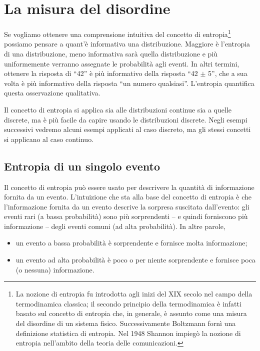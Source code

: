 \documentclass[
  11pt,
]{krantz}
\providecommand{\tightlist}{%
  \setlength{\itemsep}{0pt}\setlength{\parskip}{0pt}}
\theoremstyle{definition}
\theoremstyle{definition}
\theoremstyle{definition}
\theoremstyle{definition}
\theoremstyle{remark}
\begin{document}
\hypertarget{la-misura-del-disordine}{%
\section{La misura del disordine}\label{la-misura-del-disordine}}

Se vogliamo ottenere una comprensione intuitiva del concetto di entropia\footnote{La nozione di entropia fu introdotta agli inizi del XIX secolo nel campo della termodinamica classica; il secondo principio della termodinamica è infatti basato sul concetto di entropia che, in generale, è assunto come una misura del disordine di un sistema fisico. Successivamente Boltzmann fornì una definizione statistica di entropia. Nel 1948 Shannon impiegò la nozione di entropia nell'ambito della teoria delle comunicazioni.} possiamo pensare a quant'è informativa una distribuzione. Maggiore è l'entropia di una distribuzione, meno informativa sarà quella distribuzione e più uniformemente verranno assegnate le probabilità agli eventi. In altri termini, ottenere la risposta di ``42'' è più informativo della risposta ``42 \(\pm\) 5'', che a sua volta è più informativo della risposta ``un numero qualsiasi''. L'entropia quantifica questa osservazione qualitativa.

Il concetto di entropia si applica sia alle distribuzioni continue sia a quelle discrete, ma è più facile da capire usando le distribuzioni discrete. Negli esempi successivi vedremo alcuni esempi applicati al caso discreto, ma gli stessi concetti si applicano al caso continuo.

\hypertarget{entropia-di-un-singolo-evento}{%
\subsection{Entropia di un singolo evento}\label{entropia-di-un-singolo-evento}}

Il concetto di entropia può essere usato per descrivere la quantità di informazione fornita da un evento. L'intuizione che sta alla base del concetto di entropia è che l'informazione fornita da un evento descrive la sorpresa suscitata dall'evento: gli eventi rari (a bassa probabilità) sono più sorprendenti -- e quindi forniscono più informazione -- degli eventi comuni (ad alta probabilità). In altre parole,

\begin{itemize}
\tightlist
\item
  un evento a bassa probabilità è sorprendente e fornisce molta informazione;
\item
  un evento ad alta probabilità è poco o per niente sorprendente e fornisce poca (o nessuna) informazione.
\end{itemize}
\end{document}
